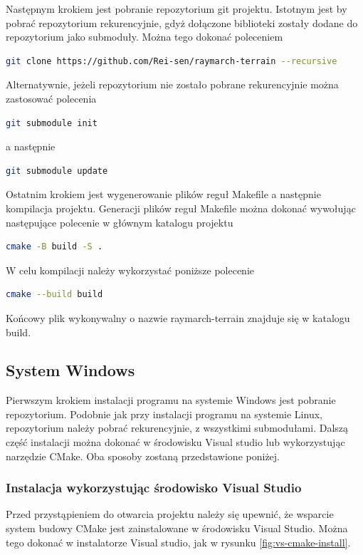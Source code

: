 Następnym krokiem jest pobranie repozytorium git projektu. Istotnym jest by pobrać repozytorium rekurencyjnie, gdyż dołączone biblioteki zostały dodane do repozytorium jako submoduły. Można tego dokonać poleceniem
\begin{lstlisting}[language=bash]
  git clone https://github.com/Rei-sen/raymarch-terrain --recursive
\end{lstlisting}
Alternatywnie, jeżeli repozytorium nie zostało pobrane rekurencyjnie można zastosować polecenia
\begin{lstlisting}[language=bash]
  git submodule init
\end{lstlisting}
a następnie
\begin{lstlisting}[language=bash]
  git submodule update
\end{lstlisting}
Ostatnim krokiem jest wygenerowanie plików reguł Makefile a następnie
kompilacja projektu. Generacji plików reguł Makefile można dokonać wywołując następujące polecenie w głównym katalogu projektu
\begin{lstlisting}[language=bash]
  cmake -B build -S .
\end{lstlisting}
W celu kompilacji należy wykorzystać poniższe polecenie
\begin{lstlisting}[language=bash]
  cmake --build build
\end{lstlisting}
Końcowy plik wykonywalny o nazwie raymarch-terrain znajduje się w katalogu build.
\subsection{System Windows}
Pierwszym krokiem instalacji programu na systemie Windows jest pobranie
repozytorium. Podobnie jak przy instalacji programu na systemie Linux, repozytorium należy pobrać rekurencyjnie, z wszystkimi submodułami.
Dalszą część instalacji można dokonać w środowisku Visual studio lub
wykorzystując narzędzie CMake. Oba sposoby zostaną przedstawione poniżej.
\subsubsection{Instalacja wykorzystując środowisko Visual Studio}
Przed przystąpieniem do otwarcia projektu należy się upewnić, że
wsparcie system budowy CMake jest zainstalowane w środowisku Visual Studio.
Można tego dokonać w instalatorze Visual studio, jak w rysunku \ref{fig:vs-cmake-install}.

